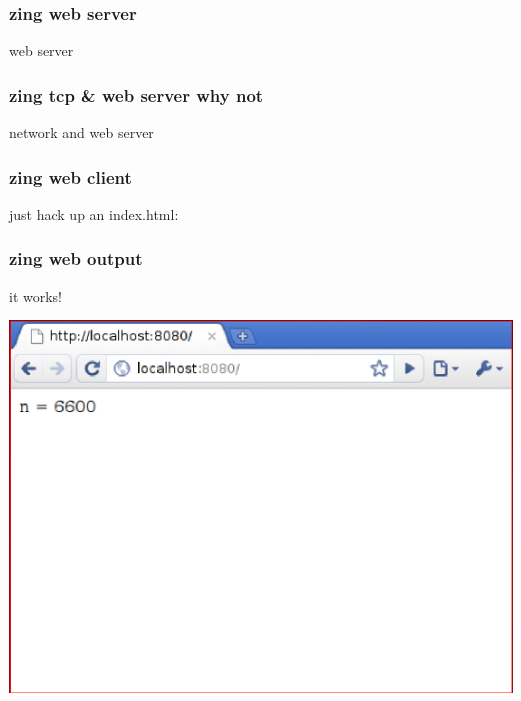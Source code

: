 \documentclass{beamer}
\begin{document}
\begin{frame}
    \frametitle{zing web server}
    
    \huge
    web server
    \newline
    
    \normalsize
    \fbox{}
\end{frame}

\begin{frame}
    \frametitle{zing tcp \& web server why not}
    
    \huge
    network and web server
    \newline
    
    \normalsize
    \fbox{}
\end{frame}

\begin{frame}
    \frametitle{zing web client}
    \huge
    just hack up an index.html:
    \newline
    
    \scriptsize
    \fbox{}
\end{frame}

\begin{frame}
    \frametitle{zing web output}
    \large
    it works!
    \newline
    
    \includegraphics[scale=0.6]{images/browser.png}
\end{frame}
\end{document}
